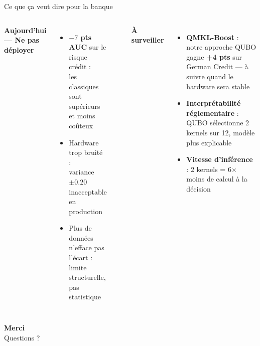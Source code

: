 \documentclass[aspectratio=169]{beamer}
\newcommand{\good}[1]{\textcolor{okgreen}{\textbf{#1}}}
\newcommand{\bad}[1]{\textcolor{badred}{\textbf{#1}}}
\begin{document}
\begin{frame}{Ce que ça veut dire pour la banque}
  \begin{columns}[T]
      \textbf{Aujourd'hui — Ne pas déployer}\\[6pt]
      \begin{itemize}
        \item \bad{$-7$ pts AUC} sur le risque crédit :\\
              les classiques sont supérieurs et moins coûteux
        \item Hardware trop bruité :\\
              variance $\pm 0.20$ inacceptable en production
        \item Plus de données n'efface pas l'écart :\\
              limite structurelle, pas statistique
      \end{itemize}

      \

      \textbf{À surveiller}\\[6pt]
      \begin{itemize}
        \item \good{QMKL-Boost} : notre approche QUBO
              gagne \good{+4 pts} sur German Credit
              — à suivre quand le hardware sera stable
        \item \good{Interprétabilité réglementaire} :\\
              QUBO sélectionne 2 kernels sur 12,
              modèle plus explicable 
        \item \good{Vitesse d'inférence} : 2 kernels =
              6$\times$ moins de calcul à la décision
      \end{itemize}

      
  \end{columns}
\end{frame}

\begin{frame}[plain]
  \centering
  \vspace{1.8cm}
  {\Huge\bfseries\color{qblue} Merci}\\[0.8em]
  \large Questions ?\\[1.8em]
  
\end{frame}
\end{document}
